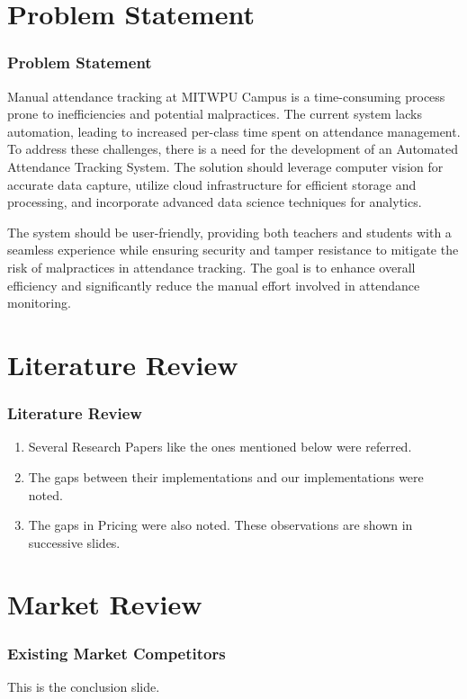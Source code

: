 \documentclass[aspectratio=169]{beamer}
\begin{document}
\section{Problem Statement}
\begin{frame}
  \frametitle{Problem Statement}
  Manual attendance tracking at MITWPU Campus is a time-consuming process prone to inefficiencies and potential malpractices. The current system lacks automation, leading to increased per-class time spent on attendance management. 
\vspace*{0.5cm}
To address these challenges, there is a need for the development of an Automated Attendance Tracking System. The solution should leverage computer vision for accurate data capture, utilize cloud infrastructure for efficient storage and processing, and incorporate advanced data science techniques for analytics. 

\vspace*{0.5cm}
The system should be user-friendly, providing both teachers and students with a seamless experience while ensuring security and tamper resistance to mitigate the risk of malpractices in attendance tracking. The goal is to enhance overall efficiency and significantly reduce the manual effort involved in attendance monitoring.

\end{frame}


\section{Literature Review}
\begin{frame}
  \frametitle{Literature Review}
  \begin{enumerate}
    \item Several Research Papers like the ones mentioned below were referred.
    \item The gaps between their implementations and our implementations were noted. 
    \item The gaps in Pricing were also noted. 
    These observations are shown in successive slides.
  \end{enumerate}
\end{frame}


\section{Market Review}
\begin{frame}
  \frametitle{Existing Market Competitors}
  This is the conclusion slide.
\end{frame}
\end{document}

